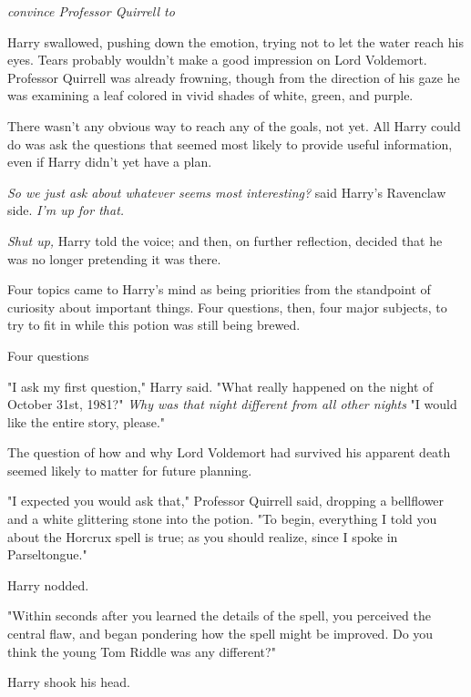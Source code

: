 \emph{{\el} convince Professor Quirrell to }

Harry swallowed, pushing down the emotion, trying not to let the water reach
his eyes. Tears probably wouldn't make a good impression on Lord Voldemort.
Professor Quirrell was already frowning, though from the direction of his gaze
he was examining a leaf colored in vivid shades of white, green, and purple.

There wasn't any obvious way to reach any of the goals, not yet. All Harry
could do was ask the questions that seemed most likely to provide useful
information, even if Harry didn't yet have a plan.

\emph{So we just ask about whatever seems most interesting?} said Harry's
Ravenclaw side. \emph{I'm up for that.}

\emph{Shut up,} Harry told the voice; and then, on further reflection, decided
that he was no longer pretending it was there.

Four topics came to Harry's mind as being priorities from the standpoint of
curiosity about important things. Four questions, then, four major subjects, to
try to fit in while this potion was still being brewed.

Four questions{\el}

"I ask my first question," Harry said. "What really happened on the night of
October 31st, 1981?" \emph{Why was that night different from all other
nights{\el}} "I would like the entire story, please."

The question of how and why Lord Voldemort had survived his apparent death
seemed likely to matter for future planning.

"I expected you would ask that," Professor Quirrell said, dropping a bellflower
and a white glittering stone into the potion. "To begin, everything I told you
about the Horcrux spell is true; as you should realize, since I spoke in
Parseltongue."

Harry nodded.

"Within seconds after you learned the details of the spell, you perceived the
central flaw, and began pondering how the spell might be improved. Do you think
the young Tom Riddle was any different?"

Harry shook his head.

